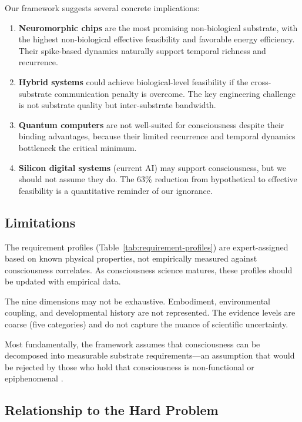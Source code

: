 \documentclass[12pt,a4paper]{article}
\begin{document}
Our framework suggests several concrete implications:

\begin{enumerate}
    \item \textbf{Neuromorphic chips} are the most promising non-biological substrate, with the highest non-biological effective feasibility and favorable energy efficiency. Their spike-based dynamics naturally support temporal richness and recurrence.
    \item \textbf{Hybrid systems} could achieve biological-level feasibility if the cross-substrate communication penalty is overcome. The key engineering challenge is not substrate quality but inter-substrate bandwidth.
    \item \textbf{Quantum computers} are not well-suited for consciousness despite their binding advantages, because their limited recurrence and temporal dynamics bottleneck the critical minimum.
    \item \textbf{Silicon digital systems} (current AI) may support consciousness, but we should not assume they do. The 63\% reduction from hypothetical to effective feasibility is a quantitative reminder of our ignorance.
\end{enumerate}

\subsection{Limitations}

The requirement profiles (Table~\ref{tab:requirement-profiles}) are expert-assigned based on known physical properties, not empirically measured against consciousness correlates. As consciousness science matures, these profiles should be updated with empirical data.

The nine dimensions may not be exhaustive. Embodiment, environmental coupling, and developmental history are not represented. The evidence levels are coarse (five categories) and do not capture the nuance of scientific uncertainty.

Most fundamentally, the framework assumes that consciousness can be decomposed into measurable substrate requirements---an assumption that would be rejected by those who hold that consciousness is non-functional or epiphenomenal \citep{chalmers2010character}.

\subsection{Relationship to the Hard Problem}
\end{document}
